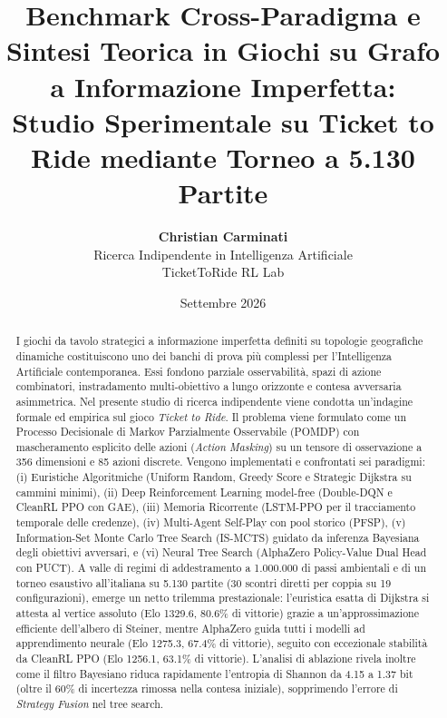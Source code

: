 \documentclass[11pt,a4paper]{article}
\begin{document}
\title{\textbf{Benchmark Cross-Paradigma e Sintesi Teorica in Giochi su Grafo a Informazione Imperfetta:\\Studio Sperimentale su Ticket to Ride mediante Torneo a 5.130 Partite}}

\author{\textbf{Christian Carminati} \\
Ricerca Indipendente in Intelligenza Artificiale \\
TicketToRide RL Lab}

\date{Settembre 2026}

\maketitle

\begin{abstract}
I giochi da tavolo strategici a informazione imperfetta definiti su topologie geografiche dinamiche costituiscono uno dei banchi di prova più complessi per l'Intelligenza Artificiale contemporanea. Essi fondono parziale osservabilità, spazi di azione combinatori, instradamento multi-obiettivo a lungo orizzonte e contesa avversaria asimmetrica. Nel presente studio di ricerca indipendente viene condotta un'indagine formale ed empirica sul gioco \textit{Ticket to Ride}. Il problema viene formulato come un Processo Decisionale di Markov Parzialmente Osservabile (POMDP) con mascheramento esplicito delle azioni (\textit{Action Masking}) su un tensore di osservazione a 356 dimensioni e 85 azioni discrete. Vengono implementati e confrontati sei paradigmi: (i) Euristiche Algoritmiche (Uniform Random, Greedy Score e Strategic Dijkstra su cammini minimi), (ii) Deep Reinforcement Learning model-free (Double-DQN e CleanRL PPO con GAE), (iii) Memoria Ricorrente (LSTM-PPO per il tracciamento temporale delle credenze), (iv) Multi-Agent Self-Play con pool storico (PFSP), (v) Information-Set Monte Carlo Tree Search (IS-MCTS) guidato da inferenza Bayesiana degli obiettivi avversari, e (vi) Neural Tree Search (AlphaZero Policy-Value Dual Head con PUCT). A valle di regimi di addestramento a 1.000.000 di passi ambientali e di un torneo esaustivo all'italiana su 5.130 partite (30 scontri diretti per coppia su 19 configurazioni), emerge un netto trilemma prestazionale: l'euristica esatta di Dijkstra si attesta al vertice assoluto (Elo 1329.6, 80.6\% di vittorie) grazie a un'approssimazione efficiente dell'albero di Steiner, mentre AlphaZero guida tutti i modelli ad apprendimento neurale (Elo 1275.3, 67.4\% di vittorie), seguito con eccezionale stabilità da CleanRL PPO (Elo 1256.1, 63.1\% di vittorie). L'analisi di ablazione rivela inoltre come il filtro Bayesiano riduca rapidamente l'entropia di Shannon da 4.15 a 1.37 bit (oltre il 60\% di incertezza rimossa nella contesa iniziale), sopprimendo l'errore di \textit{Strategy Fusion} nel tree search.
\end{abstract}
\end{document}
